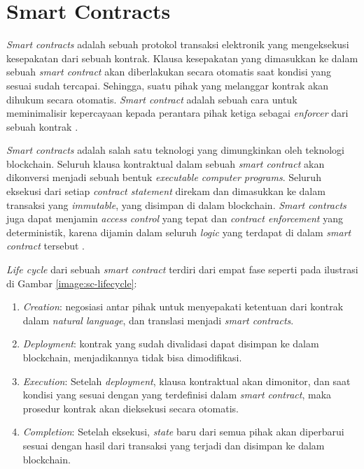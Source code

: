 \section{Smart Contracts}
\label{sec:smart-contract}

\textit{Smart contracts} adalah sebuah protokol transaksi elektronik yang mengeksekusi kesepakatan dari sebuah kontrak. Klausa kesepakatan yang dimasukkan ke dalam sebuah \textit{smart contract} akan diberlakukan secara otomatis saat kondisi yang sesuai sudah tercapai. Sehingga, suatu pihak yang melanggar kontrak akan dihukum secara otomatis. \textit{Smart contract} adalah sebuah cara untuk meminimalisir kepercayaan kepada perantara pihak ketiga sebagai \textit{enforcer} dari sebuah kontrak \parencite{szabo1997formalizing}.

\textit{Smart contracts} adalah salah satu teknologi yang dimungkinkan oleh teknologi blockchain. Seluruh klausa kontraktual dalam sebuah \textit{smart contract} akan dikonversi menjadi sebuah bentuk \textit{executable computer programs}. Seluruh eksekusi dari setiap \textit{contract statement} direkam dan dimasukkan ke dalam transaksi yang \textit{immutable}, yang disimpan di dalam blockchain. \textit{Smart contracts} juga dapat menjamin \textit{access control} yang tepat dan \textit{contract enforcement} yang deterministik, karena dijamin dalam seluruh \textit{logic} yang terdapat di dalam \textit{smart contract} tersebut \parencite{zheng2020overview}.

\textit{Life cycle} dari sebuah \textit{smart contract} terdiri dari empat fase seperti pada ilustrasi di Gambar \ref{image:sc-lifecycle}:

\begin{enumerate}
	\item \textit{Creation}: negosiasi antar pihak untuk menyepakati ketentuan dari kontrak dalam \textit{natural language}, dan translasi menjadi \textit{smart contracts}.
	\item \textit{Deployment}: kontrak yang sudah divalidasi dapat disimpan ke dalam blockchain, menjadikannya tidak bisa dimodifikasi.
	\item \textit{Execution}: Setelah \textit{deployment}, klausa kontraktual akan dimonitor, dan saat kondisi yang sesuai dengan yang terdefinisi dalam \textit{smart contract}, maka prosedur kontrak akan dieksekusi secara otomatis.
	\item \textit{Completion}: Setelah eksekusi, \textit{state} baru dari semua pihak akan diperbarui sesuai dengan hasil dari transaksi yang terjadi dan disimpan ke dalam blockchain. 
\end{enumerate}

